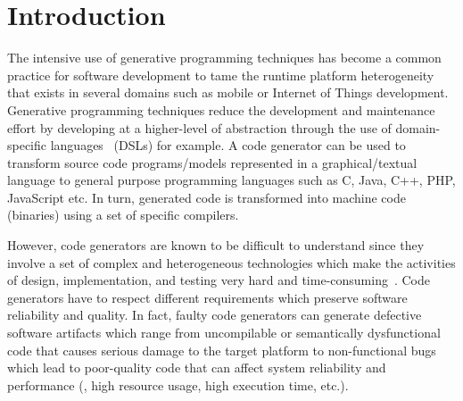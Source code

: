 \section{Introduction}

\enlargethispage{0.5cm}


The intensive use of generative programming techniques has become a common practice for software development to tame the runtime platform heterogeneity that exists in several domains such as mobile or Internet of Things development.  Generative programming techniques reduce the development and maintenance effort by developing at a higher-level of abstraction through the use of domain-specific languages~\cite{brambilla2012model} (DSLs) for example. 
A code generator can be used to transform source code programs/models represented in a graphical/textual  language to general purpose programming languages such as C, Java, C++, PHP, JavaScript etc. In turn, generated code is transformed into machine code (binaries) using a set of specific compilers.


However, code generators are known to be difficult to understand since they involve a set of complex and heterogeneous technologies which make the activities of design, implementation, and testing very hard and time-consuming~\cite{france2007model,guana2015developers}. Code generators have to respect different requirements which preserve software reliability and quality. In fact, faulty code generators can generate defective software artifacts which range from uncompilable or semantically dysfunctional code that causes serious damage to the target platform to non-functional bugs which lead to poor-quality code that can affect system reliability and performance (\eg, high resource usage, high execution time, etc.). 

